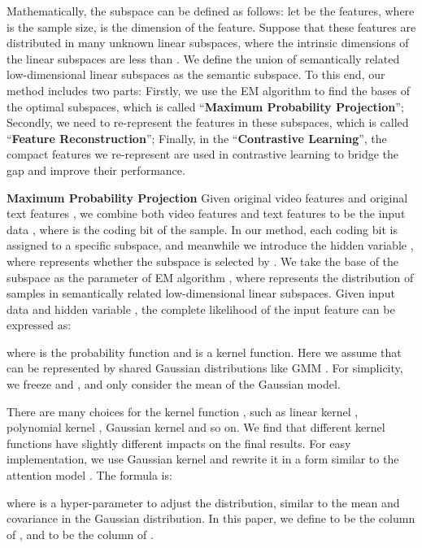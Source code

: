 \documentclass{article}
\newcommand{\myparagraph}[1]{\textbf{#1}\hspace{1.8ex}}
\begin{document}
Mathematically, the subspace can be defined as follows: let  be the features, where  is the sample size,  is the dimension of the feature. Suppose that these features are distributed in many unknown linear subspaces, where the intrinsic dimensions of the linear subspaces are less than . We define the union of  semantically related low-dimensional linear subspaces as the semantic subspace.
To this end, our method includes two parts: Firstly, we use the EM algorithm \cite{dempster1977maximum} to find the bases of the  optimal subspaces, which is called ``\textbf{Maximum Probability Projection}''; Secondly, we need to re-represent the features in these subspaces, which is called ``\textbf{Feature Reconstruction}''; Finally, in the ``\textbf{Contrastive Learning}'', the compact features we re-represent are used in contrastive learning to bridge the gap and improve their performance. 



\myparagraph{Maximum Probability Projection}
Given original video features  and original text features , we combine both video features and text features to be the input data , where  is the  coding bit of the  sample. In our method, each coding bit  is assigned to a specific subspace, and meanwhile we introduce the hidden variable , where  represents whether the  subspace is selected by . We take the base  of the subspace as the parameter of EM algorithm \cite{dempster1977maximum}, where  represents the distribution of samples in  semantically related low-dimensional linear subspaces.
Given input data  and hidden variable , the complete likelihood of the input feature  can be expressed as:

where  is the probability function and  is a kernel function. Here we assume that  can be represented by  shared Gaussian distributions like GMM \cite{richardson1997on}. For simplicity, we freeze  and , and only consider the mean  of the Gaussian model.

There are many choices for the kernel function , such as linear kernel , polynomial kernel , Gaussian kernel  and so on. We find that different kernel functions have slightly different impacts on the final results.
For easy implementation, we use Gaussian kernel and rewrite it in a form similar to the attention model \cite{bahdanau2015neural,vaswani2017attention}. The formula is:

where  is a hyper-parameter to adjust the distribution, similar to the mean and covariance in the Gaussian distribution. In this paper, we define  to be the  column of , and  to be the  column of .
\end{document}
